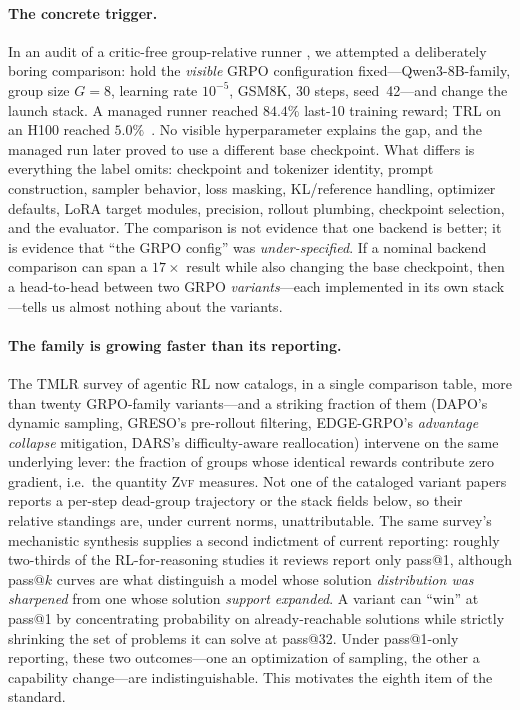 \documentclass[11pt]{article}
\newcommand{\zvf}{\textsc{Zvf}}
\begin{document}
\paragraph{The concrete trigger.}
In an audit of a critic-free group-relative runner \cite{zvfaudit2026}, we
attempted a deliberately boring comparison: hold the \emph{visible} GRPO
configuration fixed---Qwen3-8B-family, group size $G=8$, learning rate $10^{-5}$,
GSM8K, 30 steps, seed~42---and change the launch stack. A managed runner reached
$84.4\%$ last-10 training reward; TRL on an H100 reached $5.0\%$~\citep{zvfaudit2026}. No visible
hyperparameter explains the gap, and the managed run later proved to use a
different base checkpoint. What differs is everything the label omits:
checkpoint and tokenizer identity, prompt construction, sampler behavior, loss
masking, KL/reference handling, optimizer defaults, LoRA target modules,
precision, rollout plumbing, checkpoint selection, and the evaluator. The
comparison is not evidence that one backend is better; it is evidence that
``the GRPO config'' was \emph{under-specified}. If a nominal backend comparison can span a
$17\times$ result while also changing the
base checkpoint, then a head-to-head between
two GRPO \emph{variants}---each implemented in its own stack---tells us almost
nothing about the variants.

\paragraph{The family is growing faster than its reporting.}
The TMLR survey of agentic RL \cite{agenticrlsurvey2026} now catalogs, in a
single comparison table, more than twenty GRPO-family variants---and a
striking fraction of them (DAPO's dynamic sampling, GRESO's pre-rollout
filtering, EDGE-GRPO's \emph{advantage collapse} mitigation, DARS's
difficulty-aware reallocation) intervene on the same underlying lever: the
fraction of groups whose identical rewards contribute zero gradient, i.e.\
the quantity \zvf{} measures. Not one of the cataloged variant papers
reports a per-step dead-group trajectory or the stack fields below, so
their relative standings are, under current norms, unattributable. The
same survey's mechanistic synthesis supplies a second indictment of current
reporting: roughly two-thirds of the RL-for-reasoning studies it reviews
report only pass@1, although pass@$k$ curves are what distinguish a model
whose solution \emph{distribution was sharpened} from one whose solution
\emph{support expanded}. A variant can ``win'' at pass@1 by concentrating
probability on already-reachable solutions while strictly shrinking the
set of problems it can solve at pass@32. Under pass@1-only reporting, these
two outcomes---one an optimization of sampling, the other a capability
change---are indistinguishable. This motivates the eighth item of the
standard.
\end{document}
